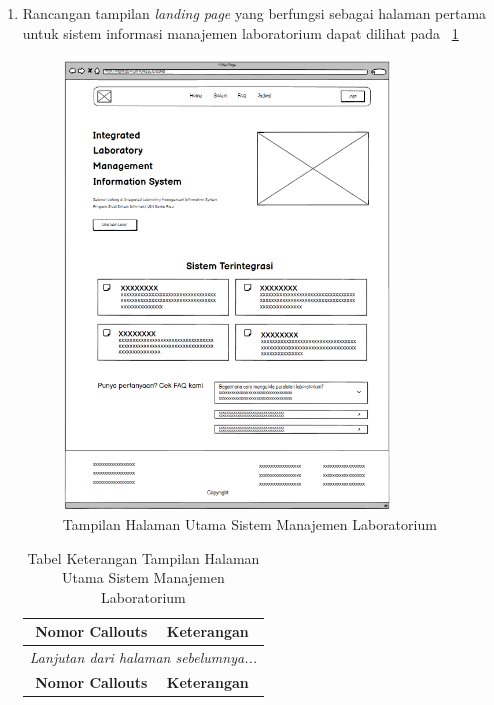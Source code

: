 \begin{enumerate}
	\item Rancangan tampilan \textit{landing page} yang berfungsi sebagai halaman pertama untuk sistem informasi manajemen laboratorium dapat dilihat pada \pic~\ref{fig:kelola-jadwal-1}
	      \begin{figure}
		      \centering
		      \includegraphics[width=0.82\textwidth]{konten/gambar/landing-page.png}
		      \caption{Tampilan Halaman Utama Sistem Manajemen Laboratorium}
		      \label{fig:kelola-jadwal-1}
	      \end{figure}

	      \begin{longtable}{|c|p{}|}
		      \caption{Tabel Keterangan Tampilan Halaman Utama Sistem Manajemen Laboratorium}                                                                 \\
		      \hline
		      \textbf{Nomor Callouts} & \textbf{Keterangan}                                                                                                   \\
		      \hline
		      \endfirsthead

		      \multicolumn{2}{c}{{\textit{Lanjutan dari halaman sebelumnya...}}}                                                                              \\
		      \hline
		      \textbf{Nomor Callouts} & \textbf{Keterangan}                                                                                                   \\
		      \hline
		      \endhead


\end{longtable}
\end{enumerate}

